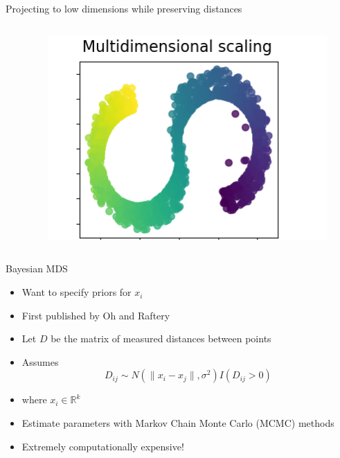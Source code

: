 \documentclass{beamer}
\begin{document}
\begin{frame}{Projecting to low dimensions while preserving distances}
\begin{columns}
\begin{column}{0.01\textwidth}
        \end{column}
        \begin{column}{0.4\textwidth}
            \begin{figure}
            \includegraphics[width=\textwidth]{standalone/mds_2.png}
        \end{figure}   
        \end{column}
    \end{columns}
    \centering
    \tiny{\cite{scikit-learn}}
\end{frame}


\begin{frame}{Bayesian MDS}
    \begin{itemize}
        \item Want to specify priors for $x_i$
        \item First published by Oh and Raftery \cite{oh2001bayesian}
        \item Let $D$ be the matrix of measured distances between points
        \item Assumes \[ D_{ij} \sim N(\lVert x_i - x_j \rVert,\sigma^2)I(D_{ij} > 0) \]
        \item where $x_i \in \mathbb{R}^k$
        \item Estimate parameters with Markov Chain Monte Carlo (MCMC) methods 
        \item Extremely computationally expensive!
    \end{itemize}
\end{frame}
\end{document}
